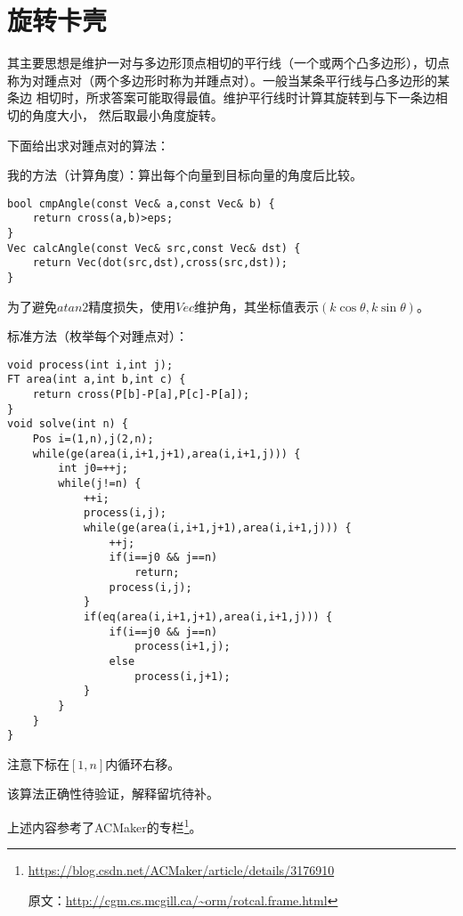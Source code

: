\section{旋转卡壳}
其主要思想是维护一对与多边形顶点相切的平行线（一个或两个凸多边形），切点
称为对踵点对（两个多边形时称为并踵点对）。一般当某条平行线与凸多边形的某条边
相切时，所求答案可能取得最值。维护平行线时计算其旋转到与下一条边相切的角度大小，
然后取最小角度旋转。

下面给出求对踵点对的算法：

我的方法（计算角度）：算出每个向量到目标向量的角度后比较。
\begin{lstlisting}
bool cmpAngle(const Vec& a,const Vec& b) {
    return cross(a,b)>eps;
}
Vec calcAngle(const Vec& src,const Vec& dst) {
    return Vec(dot(src,dst),cross(src,dst));
}
\end{lstlisting}

为了避免$atan2$精度损失，使用$Vec$维护角，其坐标值表示$(k\cos \theta,k\sin \theta)$。

标准方法（枚举每个对踵点对）：
\begin{lstlisting}
void process(int i,int j);
FT area(int a,int b,int c) {
    return cross(P[b]-P[a],P[c]-P[a]);
}
void solve(int n) {
    Pos i=(1,n),j(2,n);
    while(ge(area(i,i+1,j+1),area(i,i+1,j))) {
        int j0=++j;
        while(j!=n) {
            ++i;
            process(i,j);
            while(ge(area(i,i+1,j+1),area(i,i+1,j))) {
                ++j;
                if(i==j0 && j==n)
                    return;
                process(i,j);
            }
            if(eq(area(i,i+1,j+1),area(i,i+1,j))) {
                if(i==j0 && j==n)
                    process(i+1,j);
                else
                    process(i,j+1);
            }
        }
    }
}
\end{lstlisting}
注意下标在$[1,n]$内循环右移。

该算法正确性待验证，解释留坑待补。

上述内容参考了ACMaker的专栏\footnote{
    \url{https://blog.csdn.net/ACMaker/article/details/3176910}

    原文：\url{http://cgm.cs.mcgill.ca/\~orm/rotcal.frame.html}
}。
